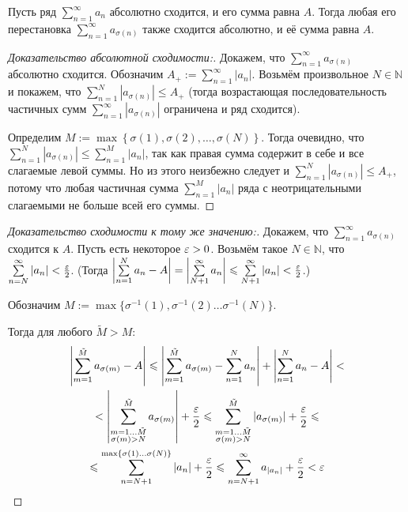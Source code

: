 \documentclass[a4paper, 12pt]{article}
\begin{document}
	\begin{Theorem}[Коши]
		Пусть ряд $\sum\limits_{n=1}^{\infty}a_n$ абсолютно сходится, и его сумма равна $A$. Тогда любая его перестановка $\sum\limits_{n=1}^{\infty}a_{\sigma(n)}$ также сходится абсолютно, и её сумма равна $A$.
	\end{Theorem}
	\begin{proof} [Доказательство абсолютной сходимости:]  
		Докажем, что $\sum\limits_{n=1}^{\infty}a_{\sigma(n)}$ абсолютно сходится.
		Обозначим $A_+ := \sum\limits_{n=1}^{\infty}|a_n|$.
		Возьмём произвольное $N\in \mathbb{N}$ и покажем, что  $\sum\limits_{n=1}^{N}|a_{\sigma(n)}| \leq A_+$ (тогда возрастающая последовательность частичных сумм $\sum\limits_{n=1}^{\infty}|a_{\sigma(n)}|$ ограничена и ряд сходится).

		Определим $M := \max \left\{\sigma(1), \sigma(2), \dots, \sigma(N)\right\}$.  Тогда очевидно, что $\sum\limits_{n=1}^{N}|a_{\sigma(n)}| \leq \sum\limits_{n=1}^{M}|a_{n}|$, так как правая сумма содержит в себе и все слагаемые левой суммы. Но из этого неизбежно следует и  $\sum\limits_{n=1}^{N}|a_{\sigma(n)}| \leq A_+$, потому что любая частичная сумма $\sum\limits_{n=1}^{M}|a_{n}|$ ряда с неотрицательными слагаемыми не больше всей его суммы.
	\end{proof}
	\begin{proof} [Доказательство сходимости к тому же значению:]		
		Докажем, что $\sum\limits_{n=1}^{\infty}a_{\sigma(n)}$ сходится к $A$. Пусть есть некоторое $\varepsilon>0$. Возьмём такое $N\in \mathbb{N}$, что $\sum\limits_{n=N}^{\infty}|a_{n}| < \frac{\varepsilon}{2}$. (Тогда $\left| \sum\limits_{n=1}^{N}a_{n} - A\right| = \left| \sum\limits_{N+1}^{\infty}a_{n}\right| \leqslant \sum\limits_{N+1}^{\infty}|a_{n}| < \frac{\varepsilon}{2}$.) 
		
		Обозначим $M := \max\{ \sigma^{-1}(1), \sigma^{-1}(2)\dots \sigma^{-1}(N)\}$.
		 
		Тогда для любого $\tilde{M}>M$:
		\begin{multline}
		 \left| \sum\limits_{m=1}^{\tilde{M}}a_{\sigma(m)} - A \right|\leqslant \left| \sum\limits_{m=1}^{\tilde{M}}a_{\sigma(m)} - \sum\limits_{n=1}^{N}a_{n} \right| + \left| \sum\limits_{n=1}^{N}a_{n} - A \right| < \\ < \left| \sum\limits_{\substack{m=1\dots \tilde{M}\\ \sigma(m)>N} }^{\tilde{M}}a_{\sigma(m)}\right| + \frac{\varepsilon}{2} \leqslant   \sum\limits_{\substack {m=1\dots \tilde{M} \\ \sigma(m)>N} }^{\tilde{M}}|a_{\sigma(m)}| + \frac{\varepsilon}{2} \leqslant \\ \leqslant \sum\limits_{n=N+1}^{\max\{ \sigma(1)\dots \sigma(N)\}}|a_n| + \frac{\varepsilon}{2} \leqslant \sum\limits_{n=N+1}^{\infty}a_{|a_n|} +  \frac{\varepsilon}{2} < \varepsilon
		 \end{multline}	
	\end{proof}
	
\end{document}
